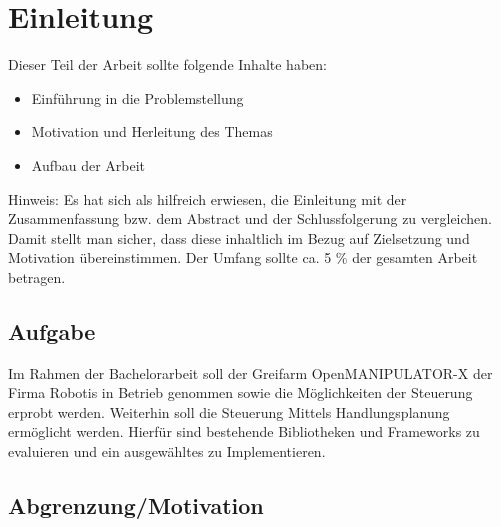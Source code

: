 \section{Einleitung} \label{einleitung}
Dieser Teil der Arbeit sollte folgende Inhalte haben:

\begin{itemize}
\item Einführung in die Problemstellung
\item Motivation und Herleitung des Themas
\item Aufbau der Arbeit
\end{itemize}

Hinweis:
Es hat sich als hilfreich erwiesen, die Einleitung mit der Zusammenfassung bzw. dem  Abstract und der Schlussfolgerung zu vergleichen. Damit stellt man sicher, dass diese inhaltlich im Bezug auf Zielsetzung und Motivation übereinstimmen. Der Umfang sollte ca. 5 \% der gesamten Arbeit betragen.
\subsection{Aufgabe}
Im Rahmen der Bachelorarbeit soll der Greifarm OpenMANIPULATOR-X der Firma Robotis in Betrieb genommen sowie die Möglichkeiten der Steuerung erprobt werden. Weiterhin soll die Steuerung Mittels Handlungsplanung ermöglicht werden. Hierfür sind bestehende Bibliotheken und Frameworks zu evaluieren und ein ausgewähltes zu Implementieren. 
\subsection{Abgrenzung/Motivation}

